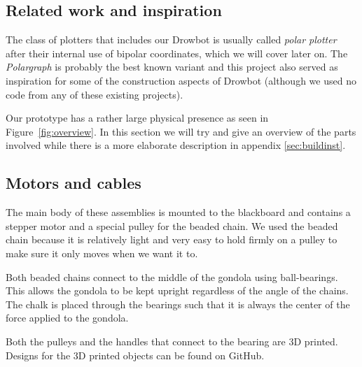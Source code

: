 \documentclass[a4paper,10pt]{article}
\begin{document}
\subsection*{Related work and inspiration}
The class of plotters that includes our Drowbot is usually called \emph{polar plotter} after their internal use
of bipolar coordinates, which we will cover later on. The \emph{Polargraph} \cite{polargraphsite} is probably the best known variant and this project also served as inspiration for some of the construction aspects of Drowbot (although we used no code from any of these existing projects).



Our prototype has a rather large physical presence as seen in Figure~\ref{fig:overview}.
In this section we will try and give an overview of the parts involved
while there is a more elaborate description in appendix \ref{sec:buildinst}.

\subsection*{Motors and cables}
The main body of these assemblies is mounted to the blackboard and
contains a stepper motor and a special pulley for the beaded chain.
We used the beaded chain because it is relatively light and very
easy to hold firmly on a pulley to make sure it only moves when
we want it to.

Both beaded chains connect to the middle of the gondola using ball-bearings. 
This allows the gondola to be kept upright regardless of the angle of the chains.
The chalk is placed through the bearings such that it is always the center of the force applied to the gondola.

Both the pulleys and the handles that connect to the bearing are 3D printed. Designs for the 3D printed objects can be found on GitHub\cite{github}.
\end{document}
